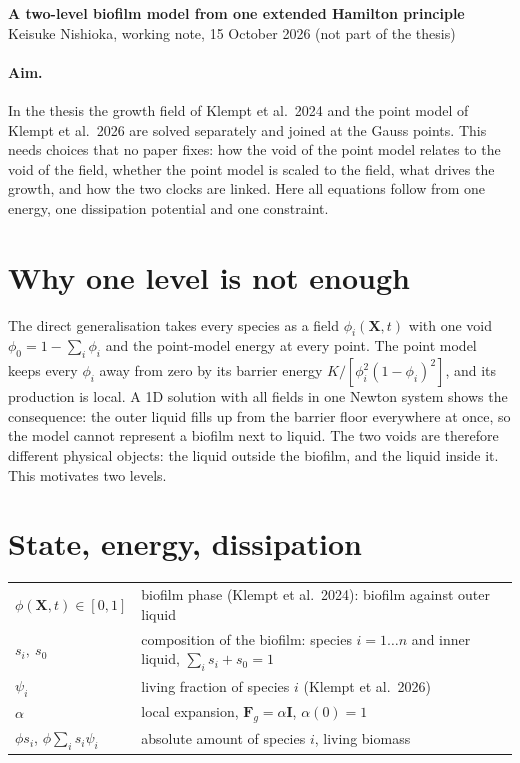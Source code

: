 \documentclass[11pt,a4paper]{article}
\begin{document}
\begin{center}
{\large\bfseries A two-level biofilm model from one extended Hamilton principle}\\[3pt]
Keisuke Nishioka, working note, 15 October 2026 (not part of the thesis)
\end{center}

\paragraph{Aim.} In the thesis the growth field of Klempt et al.\ 2024 and the point
model of Klempt et al.\ 2026 are solved separately and joined at the Gauss points.
This needs choices that no paper fixes: how the void of the point model relates to the
void of the field, whether the point model is scaled to the field, what drives the
growth, and how the two clocks are linked. Here all equations follow from one energy,
one dissipation potential and one constraint.

\section{Why one level is not enough}

The direct generalisation takes every species as a field $\phi_i(\mathbf X,t)$ with one
void $\phi_0=1-\sum_i\phi_i$ and the point-model energy at every point. The point model
keeps every $\phi_i$ away from zero by its barrier energy
$K/[\phi_i^2(1-\phi_i)^2]$,
and its production is local. A 1D solution with all fields in one Newton system
shows the consequence: the outer liquid
fills up from the barrier floor everywhere at once, so the model cannot represent a
biofilm next to liquid. The two voids are therefore different physical objects: the
liquid outside the biofilm, and the liquid inside it. This motivates two levels.

\section{State, energy, dissipation}

\begin{tabular}{@{}ll@{}}
$\phi(\mathbf X,t)\in[0,1]$ & biofilm phase (Klempt et al.\ 2024): biofilm against outer liquid\\
$s_i,\ s_0$ & composition of the biofilm: species $i=1\dots n$ and inner liquid, $\sum_i s_i+s_0=1$\\
$\psi_i$ & living fraction of species $i$ (Klempt et al.\ 2026)\\
$\alpha$ & local expansion, $\mathbf F_g=\alpha\mathbf I$, $\alpha(0)=1$\\
$\phi s_i$, $\phi\sum_i s_i\psi_i$ & absolute amount of species $i$, living biomass
\end{tabular}
\end{document}
